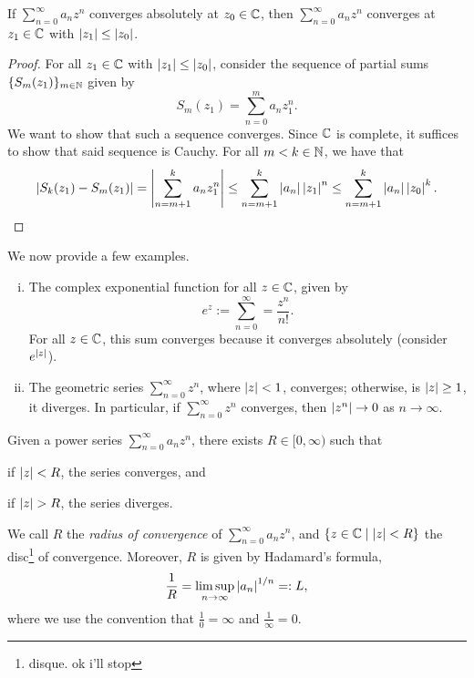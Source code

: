 \newpage
\begin{proposition}
    If $\sum_{n=0}^\infty a_nz^n$ converges absolutely at $z_0 \in \mathbb C$, then $\sum_{n=0}^\infty a_nz^n$ converges at $z_1 \in \mathbb C$ with $\left\lvert z_1 \right\rvert \leq \left\lvert z_0 \right\rvert$.
\end{proposition}
\begin{proof}
    For all $z_1 \in \mathbb C$ with $\left\lvert z_1 \right\rvert \leq \left\lvert z_0 \right\rvert$, consider the sequence of partial sums $\{S_m(z_1)\}_{m \in \mathbb N}$ given by
    \[ S_m(z_1) = \sum_{n=0}^m a_n z_1^n. \]
    We want to show that such a sequence converges. Since $\mathbb C$ is complete, it suffices to show that said sequence is Cauchy. For all $m < k \in \mathbb N$, we have that
    \[ \left\lvert S_k(z_1) - S_m(z_1) \right\rvert = \left\lvert \sum_{n=m+1}^k a_n z_1^n \right\rvert \leq \sum_{n=m+1}^k \left\lvert a_n \right\rvert \left\lvert z_1 \right\rvert^n \leq \sum_{n=m+1}^k \left\lvert a_n \right\rvert \left\lvert z_0 \right\rvert^k. \qedhere \]
\end{proof}
\noindent We now provide a few examples.
\begin{enumerate}[(i)]
    \item The complex exponential function for all $z \in \mathbb C$, given by
    \[ e^z := \sum_{n=0}^\infty = \frac{z^n}{n!}. \]
    For all $z \in \mathbb C$, this sum converges because it converges absolutely (consider $e^{\left\lvert z \right\rvert}$).
    \item The geometric series $\sum_{n=0}^\infty z^n$, where $\left\lvert z \right\rvert < 1$, converges; otherwise, is $\left\lvert z \right\rvert \geq 1$, it diverges. In particular, if $\sum_{n=0}^\infty z^n$ converges, then $\left\lvert z^n \right\rvert \to 0$ as $n \to \infty$.
\end{enumerate}
\begin{theorem}
    Given a power series $\sum_{n=0}^\infty a_n z^n$, there exists $R \in [0, \infty)$ such that \begin{parlist}
        \item if $\left\lvert z \right\rvert < R$, the series converges, and
        \item if $\left\lvert z \right\rvert > R$, the series diverges.
    \end{parlist} We call $R$ the \textit{radius of convergence} of $\sum_{n=0}^\infty a_n z^n$, and $\{z \in \mathbb C \mid \left\lvert z \right\rvert < R\}$ the disc\footnote{disque. ok i'll stop} of convergence. Moreover, $R$ is given by Hadamard's formula,
    \[ \frac{1}{R} = \limsup_{n \to \infty} \left\lvert a_n \right\rvert^{1/n} =: L, \]
    where we use the convention that $\frac{1}{0} = \infty$ and $\frac{1}{\infty} = 0$.
\end{theorem}
